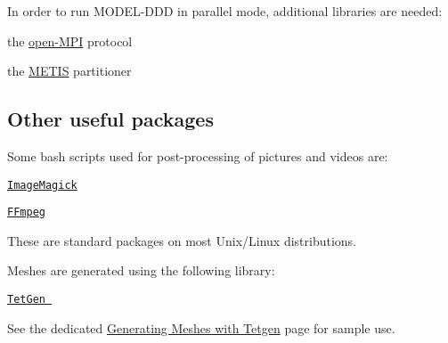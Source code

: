 In order to run M\+O\+D\+E\+L-\/\+D\+D\+D in parallel mode, additional libraries are needed\+:
\begin{DoxyItemize}
\item the \hyperlink{openmpi}{open-\/\+M\+P\+I} protocol
\item the \hyperlink{metis}{M\+E\+T\+I\+S} partitioner
\end{DoxyItemize}\hypertarget{index_packages}{}\subsection{Other useful packages}\label{index_packages}
Some bash scripts used for post-\/processing of pictures and videos are\+:
\begin{DoxyItemize}
\item \href{http://www.imagemagick.org}{\tt Image\+Magick}
\item \href{http://www.ffmpeg.org}{\tt F\+Fmpeg}
\end{DoxyItemize}

These are standard packages on most Unix/\+Linux distributions.

Meshes are generated using the following library\+:
\begin{DoxyItemize}
\item \href{http://tetgen.berlios.de}{\tt Tet\+Gen }
\end{DoxyItemize}

See the dedicated \hyperlink{tetgen}{Generating Meshes with Tetgen} page for sample use. 